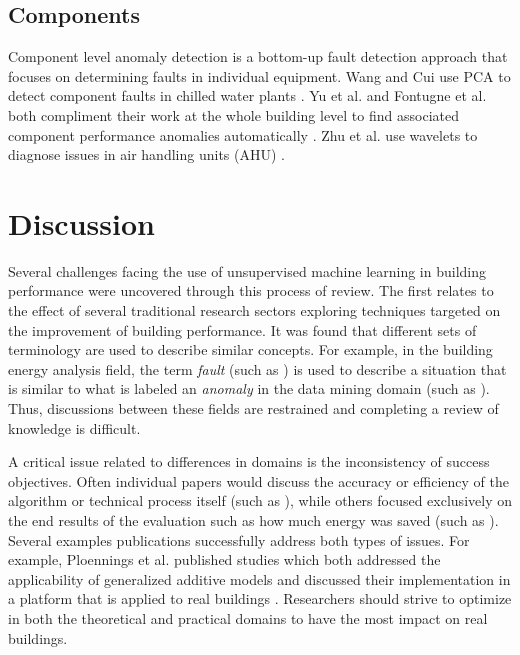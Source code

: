 \subsection{Components}
Component level anomaly detection is a bottom-up fault detection approach that focuses on determining faults in individual equipment. Wang and Cui use PCA to detect component faults in chilled water plants  \citep{wang_sensor-fault_2005}. Yu et al. and Fontugne et al. both compliment their work at the whole building level to find associated component performance anomalies automatically \citep{yu_novel_2012,fontugne_mining_2013}. Zhu et al. use wavelets to diagnose issues in air handling units (AHU) \citep{zhu_fault_2012}.

\section{Discussion}
\label{discussion}
Several challenges facing the use of unsupervised machine learning in building performance were uncovered through this process of review. The first relates to the effect of several traditional research sectors exploring techniques targeted on the improvement of building performance. It was found that different sets of terminology are used to describe similar concepts. For example, in the building energy analysis field, the term \emph{fault} (such as \citep{zhu_fault_2012}) is used to describe a situation that is similar to what is labeled an \emph{anomaly} in the data mining domain (such as \citep{fontugne_mining_2013}). Thus, discussions between these fields are restrained and completing a review of knowledge is difficult.

A critical issue related to differences in domains is the inconsistency of success objectives. Often individual papers would discuss the accuracy or efficiency of the algorithm or technical process itself (such as \citep{iglesias_analysis_2013}), while others focused exclusively on the end results of the evaluation such as how much energy was saved (such as \citep{seem_using_2006}). Several examples publications successfully address both types of issues. For example, Ploennings et al. published studies which both addressed the applicability of generalized additive models and discussed their implementation in a platform that is applied to real buildings \citep{ploennigs_exploiting_2013,ploennigs_e2-diagnoser:_2014}. Researchers should strive to optimize in both the theoretical and practical domains to have the most impact on real buildings.

